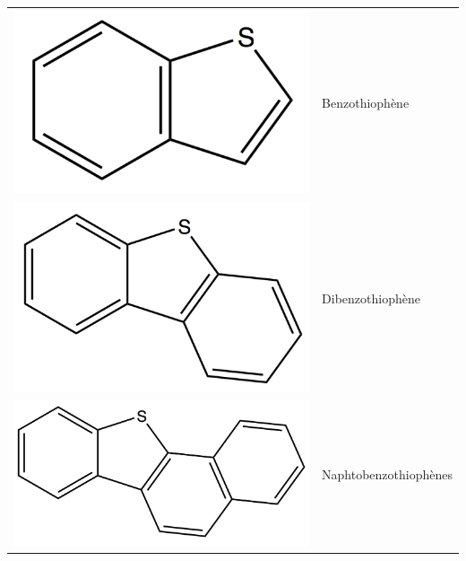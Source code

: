 \documentclass[12pt,a4paper]{book}
\begin{document}
\begin{table}[h!]
\begin{center}
\begin{tabular}{rl}
			\includegraphics[scale=0.08]{../image/benzothiophene} & Benzothiophène \\
			\includegraphics[scale=0.08]{../image/dibenzothiophene} & Dibenzothiophène \\
			\includegraphics[scale=0.08]{../image/naphto1} & Naphtobenzothiophènes \\

\end{tabular}
\end{center}
\end{table}
\end{document}
